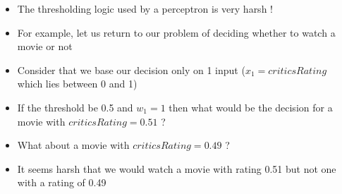 \documentclass[serif, aspectratio=169]{beamer}
\begin{document}

\begin{frame}
\begin{columns}

\begin{overlayarea}{\textwidth}{\textheight}
\end{overlayarea}

\begin{overlayarea}{\textwidth}{\textheight}
\begin{itemize}\justifying
\item The thresholding logic used by a perceptron is very harsh !
\item For example, let us return to our problem of deciding whether to watch a movie or not
\item Consider that we base our decision only on 1 input ($x_1 = criticsRating$ which lies between 0 and 1)
\item If the threshold be 0.5 and $w_1 = 1$ then what would be the decision for a movie with $criticsRating=0.51$ ? 
\item What about a movie with $criticsRating=0.49$ ? 
\item It seems harsh that we would watch a movie with rating 0.51 but not one with a rating of 0.49
\end{itemize}
\end{overlayarea}
\end{columns}
\end{frame}
\end{document}
